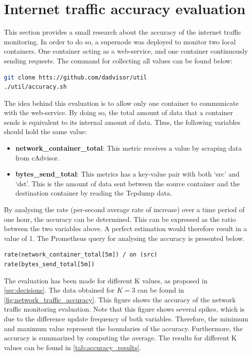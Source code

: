 \section{Internet traffic accuracy evaluation} \label{sec:eval_k}
This section provides a small research about the accuracy of the internet traffic monitoring. In order to do so, a supernode was deployed to monitor two local containers. One container acting as a web-service, and one container continuously sending requests. The command for collecting all values can be found below:

\begin{lstlisting}[language=bash, caption=Docker-compose]
git clone htts://github.com/dadvisor/util
./util/accuracy.sh
\end{lstlisting}

\noindent
The idea behind this evaluation is to allow only one container to communicate with the web-service. By doing so, the total amount of data that a container sends is equivalent to its internal amount of data. Thus, the following variables should hold the same value:
\begin{itemize}
    \item \textbf{network\_container\_total}: This metric receives a value by scraping data from cAdvisor.
    \item \textbf{bytes\_send\_total}: This metrics has a key-value pair with both `src' and `dst'. This is the amount of data sent between the source container and the destination container by reading the Tcpdump data.
\end{itemize}

\noindent
By analysing the rate (per-second average rate of increase) over a time period of one hour, the accuracy can be determined. This can be expressed as the ratio between the two variables above. A perfect estimation would therefore result in a value of 1. The Prometheus query for analysing the accuracy is presented below.

\begin{verbatim}
rate(network_container_total[5m]) / on (src) 
rate(bytes_send_total[5m])
\end{verbatim}

\noindent
The evaluation has been made for different K values, as proposed in \autoref{sec:decisions}. The data obtained for $K = 3$ can be found in \autoref{fig:network_traffic_accuracy}. This figure shows the accuracy of the network traffic monitoring evaluation. Note that this figure shows several spikes, which is due to the difference update frequency of 
both variables. Therefore, the minimum and maximum value represent the boundaries of the accuracy. Furthermore, the accuracy is summarized by computing the average. The results for different K values can be found in \autoref{tab:accuracy_results}.

